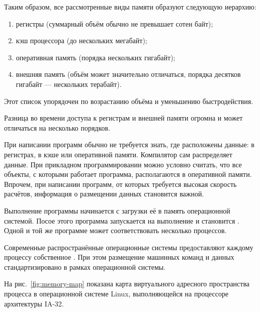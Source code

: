 Таким образом, все рассмотренные виды памяти образуют следующую
иерархию:
\begin{enumerate}
\item регистры (суммарный объём обычно не превышает сотен байт);
\item кэш процессора (до нескольких мегабайт);
\item оперативная память (порядка нескольких гигабайт);
\item внешняя память (объём может значительно отличаться, порядка
  десятков гигабайт — нескольких терабайт).
\end{enumerate}

Этот список упорядочен по возрастанию объёма и уменьшению
быстродействия.

Разница во времени доступа к регистрам и внешней памяти огромна и
может отличаться на несколько порядков.

При написании программ обычно не требуется знать, где расположены
данные: в регистрах, в кэше или оперативной памяти. Компилятор сам
распределяет данные. При прикладном программировании можно условно
считать, что все объекты, с которыми работает программа, располагаются
в оперативной памяти. Впрочем, при написании программ, от которых
требуется высокая скорость расчётов, информация о размещении данных
становится важной.


Выполнение программы начинается с загрузки её в память операционной
системой. Посое этого программа запускается на выполнение и становится
. Одной и той же программе может
соответствовать несколько процессов.

Современные распространённые операционные системы предоставляют
каждому процессу собственное . При этом размещение машинных команд и данных
стандартизировано в рамках операционной системы.

На рис.~\ref{fig:memory-map} показана карта виртуального адресного
пространства процесса в операционной системе Linux, выполняющейся на
процессоре архитектуры IA-32.

